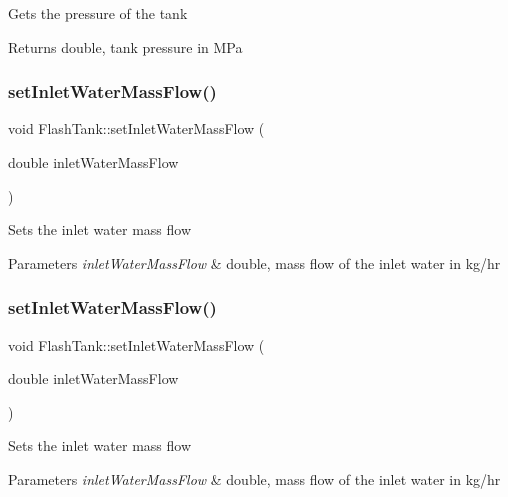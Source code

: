 Gets the pressure of the tank \begin{DoxyReturn}{Returns}
double, tank pressure in M\+Pa 
\end{DoxyReturn}
\mbox{\label{class_flash_tank_a2bcbd92d39ef3c760bdd65066ba3d34a}} 
\subsubsection{\texorpdfstring{set\+Inlet\+Water\+Mass\+Flow()}{setInletWaterMassFlow()}\hspace{0.1cm}{\footnotesize\ttfamily [1/3]}}
{\footnotesize\ttfamily void Flash\+Tank\+::set\+Inlet\+Water\+Mass\+Flow (\begin{DoxyParamCaption}\item[{double}]{inlet\+Water\+Mass\+Flow }\end{DoxyParamCaption})}

Sets the inlet water mass flow 
\begin{DoxyParams}{Parameters}
{\em inlet\+Water\+Mass\+Flow} & double, mass flow of the inlet water in kg/hr \\
\hline
\end{DoxyParams}
\mbox{\label{class_flash_tank_a2bcbd92d39ef3c760bdd65066ba3d34a}} 
\subsubsection{\texorpdfstring{set\+Inlet\+Water\+Mass\+Flow()}{setInletWaterMassFlow()}\hspace{0.1cm}{\footnotesize\ttfamily [2/3]}}
{\footnotesize\ttfamily void Flash\+Tank\+::set\+Inlet\+Water\+Mass\+Flow (\begin{DoxyParamCaption}\item[{double}]{inlet\+Water\+Mass\+Flow }\end{DoxyParamCaption})}

Sets the inlet water mass flow 
\begin{DoxyParams}{Parameters}
{\em inlet\+Water\+Mass\+Flow} & double, mass flow of the inlet water in kg/hr \\
\hline
\end{DoxyParams}


